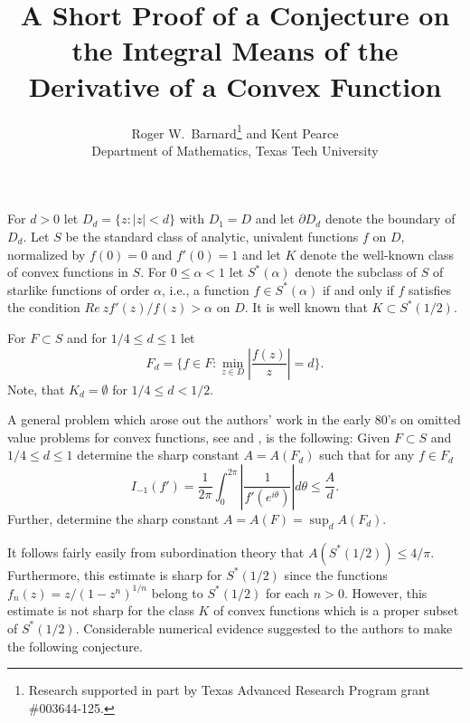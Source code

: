 

\title{A Short Proof of a Conjecture on the Integral Means of the
Derivative of a Convex Function}

\author{Roger W.\ Barnard\thanks{Research supported in part by
Texas Advanced Research Program grant \#003644-125.} and Kent
Pearce\\
Department of Mathematics, Texas Tech University}

\date{}

\maketitle

For $d>0$ let $D_d=\{z:|z|<d\}$ with $D_1=D$ and let $\partial D_d$ denote
the boundary of $D_d$.  Let $S$ be the standard class of analytic,
univalent functions $f$ on $D$, normalized by $f(0)=0$ and $f'(0)=1$
and let $K$ denote the well-known class of convex functions in $S$.
For $0\leq\alpha<1$ let $S^\ast(\alpha)$ denote the subclass of $S$
of starlike functions of order $\alpha$, i.e., a function $f\in
S^\ast(\alpha)$ if and only if $f$ satisfies the condition ${Re}\:
zf'(z)/f(z)>\alpha$ on $D$.  It is well known that $K\subset S^\ast
(1/2)$.

For $F\subset S$ and for $1/4\leq d\leq 1$ let
$$F_d=\{f\in F:\min_{z\in D}\left|\frac{f(z)}{z}\right|=d\}.$$
Note, that $K_d=\emptyset$ for $1/4\leq d<1/2$.

A general problem which arose out the authors' work in the early 80's
on omitted value problems for convex functions, see \cite{Ba} and
\cite{BaPe1}, is the following: Given $F\subset S$ and $1/4\leq d\leq
1$ determine the sharp constant $A=A(F_d)$ such that for any $f\in F_d$
\begin{equation}
\label{eq:1}
I_{-1}(f')=\frac{1}{2\pi}\int^{2\pi}_0
\left|\frac{1}{f'(e^{i\theta})}\right|d\theta\leq\frac{A}{d}.
\end{equation}
Further, determine the sharp constant $A=A(F)=\displaystyle{\sup_d}
A(F_d)$.

It follows fairly easily from subordination theory that
$A(S^\ast(1/2))\leq 4/\pi$.  Furthermore, this estimate is sharp for
$S^\ast(1/2)$ since the functions $f_n(z)=z/(1-z^n)^{1/n}$ belong to
$S^\ast(1/2)$ for each $n>0$.  However, this estimate is not sharp
for the class $K$ of convex functions which is a proper subset of
$S^\ast(1/2)$.  Considerable numerical evidence suggested to the
authors to make the following conjecture.

